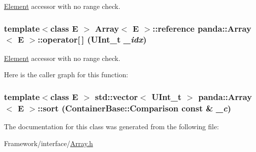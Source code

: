 \hyperlink{classpanda_1_1Element}{Element} accessor with no range check. \hypertarget{classpanda_1_1Array_aaf72094bc5c101f74966d9aac34066cf}{
\subsubsection[{operator[]}]{\setlength{\rightskip}{0pt plus 5cm}template$<$class E $>$ {\bf Array}$<$ E $>$::{\bf reference} {\bf panda::Array}$<$ E $>$::operator\mbox{[}$\,$\mbox{]} (UInt\_\-t {\em \_\-idx})}}
\label{classpanda_1_1Array_aaf72094bc5c101f74966d9aac34066cf}


\hyperlink{classpanda_1_1Element}{Element} accessor with no range check. 

Here is the caller graph for this function:\hypertarget{classpanda_1_1Array_a5c73a2221ab0eef710765585279a6c32}{
\subsubsection[{sort}]{\setlength{\rightskip}{0pt plus 5cm}template$<$class E $>$ std::vector$<$ UInt\_\-t $>$ {\bf panda::Array}$<$ E $>$::sort ({\bf ContainerBase::Comparison} const \& {\em \_\-c})}}
\label{classpanda_1_1Array_a5c73a2221ab0eef710765585279a6c32}


The documentation for this class was generated from the following file:\begin{DoxyCompactItemize}
\item 
Framework/interface/\hyperlink{Array_8h}{Array.h}\end{DoxyCompactItemize}
